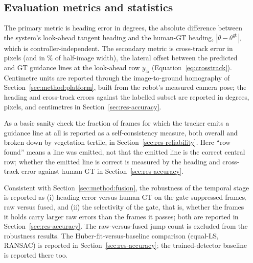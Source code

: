 \subsection{Evaluation metrics and statistics}
\label{sec:setup-metrics}

\noindent The primary metric is heading error in degrees, the absolute difference between the system's
look-ahead tangent heading and the human-GT heading, $|\theta - \theta^{\mathrm{gt}}|$, which is
controller-independent. The secondary metric is cross-track error in pixels (and in \% of half-image width),
the lateral offset between the predicted and GT guidance lines at the look-ahead row $y_{\mathrm{la}}$
(Equation~\eqref{eq:crosstrack}). Centimetre units are reported through the image-to-ground
homography of Section~\ref{sec:method:platform}, built from the robot's measured camera pose; the heading and
cross-track errors against the labelled subset are reported in degrees, pixels, and centimetres in
Section~\ref{sec:res-accuracy}.

As a basic sanity check the fraction of frames for which the tracker emits a guidance line at all is reported
as a self-consistency measure, both overall and broken down by vegetation tertile, in
Section~\ref{sec:res-reliability}. Here ``row found'' means a line was emitted, not that the emitted line is
the correct central row; whether the emitted line is correct is measured by the heading and cross-track error
against human GT in Section~\ref{sec:res-accuracy}.

Consistent with Section~\ref{sec:method:fusion}, the robustness of the temporal stage is reported as (i)
heading error versus human GT on the gate-suppressed frames, raw versus fused, and (ii) the selectivity of
the gate, that is, whether the frames it holds carry larger raw errors than the frames it passes; both are
reported in Section~\ref{sec:res-accuracy}. The raw-versus-fused jump count is excluded from the robustness
results. The Huber-fit-versus-baseline comparison (equal-LS, RANSAC) is reported in
Section~\ref{sec:res-accuracy}; the trained-detector baseline is reported there too.

